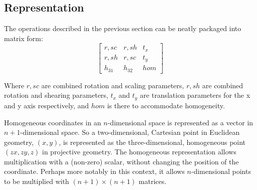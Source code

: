 \subsection{Representation}
The operations described in the previous section can be neatly packaged into
matrix form:
$$
\begin{bmatrix}
	r,sc & r,sh & t_{x} \\
	r,sh & r,sc & t_{y} \\
	h_{31} & h_{32} & hom
\end{bmatrix}
$$

Where $r,sc$ are combined rotation and scaling parameters, $r,sh$ are combined
rotation and shearing parameters, $t_{x}$ and $t_{y}$ are translation
parameters for the x and y axis respectively, and $hom$ is there to accommodate
homogeneity. 

Homogeneous coordinates in an $n$-dimensional space is represented as a vector
in $n+1$-dimensional space. So a two-dimensional, Cartesian point in Euclidean
geometry, $(x,y)$, is represented as the three-dimensional, homogeneous point
$(zx,zy,z)$ in projective geometry.  The homogeneous representation allows
multiplication with a (non-zero) scalar, without changing the position of the
coordinate. Perhaps more notably in this context, it allows $n$-dimensional
points to be multiplied with $(n+1)\times (n+1)$ matrices.

